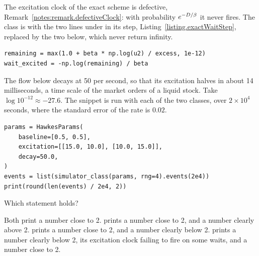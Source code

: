 \begin{question}
\label{question.clippedExcitationClockAddsEvents}
The excitation clock of the exact scheme is defective, Remark~\ref{notes:remark.defectiveClock}:
with probability $e^{-D/\beta}$ it never fires.
The class  is 
with the two lines under  in its step, Listing~\ref{listing.exactWaitStep},
replaced by the two below, which never return infinity.
\begin{lstlisting}[caption={The excitation clock of \protect\codehl{Clipped}}, label=listing.clippedExcitationClockAddsEventsVariant]
remaining = max(1.0 + beta * np.log(u2) / excess, 1e-12)
wait_excited = -np.log(remaining) / beta
\end{lstlisting}
The flow below decays at 50 per second,
so that its excitation halves in about 14 milliseconds,
a time scale of the market orders of a liquid stock.
Take $\log 10^{-12} \approx -27.6$.
The snippet is run with  each of the two classes,
over $2 \times 10^{4}$ seconds, where the standard error of the rate is $0.02$.
\begin{lstlisting}[caption={Run once with each class}, label=listing.clippedExcitationClockAddsEventsRun]
params = HawkesParams(
    baseline=[0.5, 0.5],
    excitation=[[15.0, 10.0], [10.0, 15.0]],
    decay=50.0,
)
events = list(simulator_class(params, rng=4).events(2e4))
print(round(len(events) / 2e4, 2))
\end{lstlisting}
Which statement holds?
\begin{choices}
 \choice Both print a number close to 2.
 \correctchoice {} prints a number close to 2,
  and  a number clearly above 2.
 \choice {} prints a number close to 2,
  and  a number clearly below 2.
 \choice {} prints a number clearly below 2,
  its excitation clock failing to fire on some waits,
  and  a number close to 2.
\end{choices}
\end{question}

